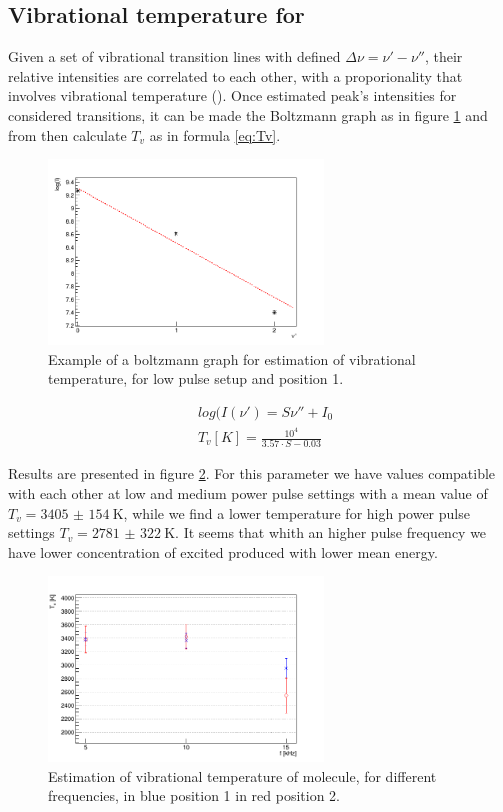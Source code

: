 \subsection{Vibrational temperature for }
Given a set of vibrational transition lines with defined $\Delta \nu = \nu' - \nu''$, their relative intensities are correlated to each other, with a proporionality that involves vibrational temperature (\cite{Britun_2007}).
Once estimated peak's intensities for considered transitions, it can be made the Boltzmann graph as in figure \ref{fig:boltzex} and from then calculate $T_v$ as in formula \ref{eq:Tv}.
\begin{figure}
\centering
\includegraphics[width=0.65\textwidth]{Images/Spectroscopy/boltzman_f5t16v.png}
 \caption{Example of a boltzmann graph for estimation of vibrational temperature, for low pulse setup and position 1.}
 \label{fig:boltzex}
\end{figure}

\begin{equation}
 \begin{split}
  & log(I(\nu') = S \nu'' + I_0 \\
  & T_v [K] = \frac{10^4}{3.57 \cdot S - 0.03}
 \end{split}
\label{eq:Tv}
\end{equation}

Results are presented in figure \ref{fig:TvN2}. For this parameter we have values compatible with each other at low and medium power pulse settings with a mean value of $T_v = \SI{3405(154)}{\kelvin}$, while we find a lower temperature for high power pulse settings $T_v = \SI{2781(322)}{\kelvin}$. It seems that whith an higher pulse frequency we have lower concentration of excited  produced with lower mean energy.
\begin{figure}
\centering
\includegraphics[width=0.65\textwidth]{Images/Spectroscopy/TvN2.png}
 \caption{Estimation of vibrational temperature of  molecule, for different frequencies, in blue position 1 in red position 2.}
 \label{fig:TvN2}
\end{figure}


